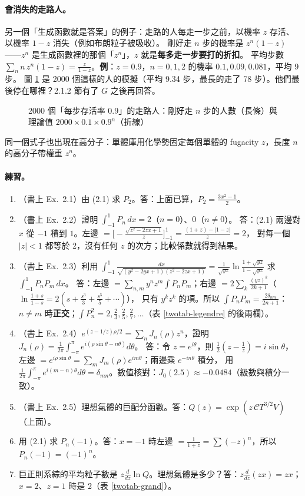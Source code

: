 \paragraph{會消失的走路人。}
另一個「生成函數就是答案」的例子：走路的人每走一步之前，以機率 $z$ 存活、以機率 $1-z$ 消失（例如布朗粒子被吸收）。
剛好走 $n$ 步的機率是 $z^n(1-z)$——$z^n$ 是生成函數裡的那個「$z^n$」，$z$ 就是\textbf{每多走一步要打的折扣}。
平均步數 $\sum_nn\,z^n(1-z)=\frac{z}{1-z}$。\textbf{例}：$z=0.9$，$n=0,1,2$ 的機率 $0.1,0.09,0.081$，平均 9 步。
圖 \ref{twofig-mortal} 是 2000 個這樣的人的模擬（平均 9.34 步，最長的走了 78 步）。他們最後停在哪裡？2.1.2 節有了 $G$ 之後再回答。
\begin{figure}[H]
\centering
\TwoFigMortal
\caption{2000 個「每步存活率 0.9」的走路人：剛好走 $n$ 步的人數（長條）與理論值 $2000\times0.1\times0.9^n$（折線）}\label{twofig-mortal}
\end{figure}
同一個式子也出現在高分子：單體庫用化學勢固定每個單體的 fugacity $z$，長度 $n$ 的高分子帶權重 $z^n$。

\paragraph{練習。}
\begin{enumerate}
\item（書上 Ex.~2.1）由 (2.1) 求 $P_2$。\quad 答：上面已算，$P_2=\frac{3x^2-1}{2}$。
\item（書上 Ex.~2.2）證明 $\int_{-1}^1P_n\,dx=2$（$n=0$）、$0$（$n\ne0$）。\quad
答：(2.1) 兩邊對 $x$ 從 $-1$ 積到 $1$。左邊 $=\Big[-\frac{\sqrt{z^2-2zx+1}}{z}\Big]_{-1}^{1}=\frac{(1+z)-|1-z|}{z}=2$，
對每一個 $|z|<1$ 都等於 2，沒有任何 $z$ 的次方；比較係數就得到結果。
\item（書上 Ex.~2.3）利用 $\int_{-1}^1\frac{dx}{\sqrt{(y^2-2yx+1)(z^2-2zx+1)}}=\frac1{\sqrt{yz}}\ln\frac{1+\sqrt{yz}}{1-\sqrt{yz}}$ 求 $\int_{-1}^1P_nP_m\,dx$。\quad
答：左邊 $=\sum_{n,m}y^nz^m\int P_nP_m$；右邊 $=2\sum_k\frac{(yz)^k}{2k+1}$（$\ln\frac{1+s}{1-s}=2(s+\frac{s^3}3+\frac{s^5}5+\cdots)$），
只有 $y^kz^k$ 的項。所以 $\int P_nP_m=\frac{2\delta_{nm}}{2n+1}$：$n\ne m$ 時\textbf{正交}；$\int P_n^2=2,\frac23,\frac25,\frac27,\dots$（表 \ref{twotab-legendre} 的後兩欄）。
\item（書上 Ex.~2.4）$e^{(z-1/z)\rho/2}=\sum_nJ_n(\rho)z^n$，證明 $J_n(\rho)=\frac1{2\pi}\int_{-\pi}^{\pi}e^{i(\rho\sin\theta-n\theta)}d\theta$。\quad
答：令 $z=e^{i\theta}$，則 $\frac12(z-\frac1z)=i\sin\theta$，左邊 $=e^{i\rho\sin\theta}=\sum_mJ_m(\rho)e^{im\theta}$；兩邊乘 $e^{-in\theta}$ 積分，
用 $\frac1{2\pi}\int_{-\pi}^{\pi}e^{i(m-n)\theta}d\theta=\delta_{mn}$。數值核對：$J_0(2.5)\approx-0.0484$（級數與積分一致）。
\item（書上 Ex.~2.5）理想氣體的巨配分函數。\quad 答：$Q(z)=\exp(z\,\mathcal CT^{3/2}V)$（上面）。
\item 用 (2.1) 求 $P_n(-1)$。\quad 答：$x=-1$ 時左邊 $=\frac1{1+z}=\sum(-z)^n$，所以 $P_n(-1)=(-1)^n$。
\item 巨正則系綜的平均粒子數是 $z\frac{d}{dz}\ln Q$。理想氣體是多少？\quad 答：$z\frac{d}{dz}(zx)=zx$；$x=2$、$z=1$ 時是 2（表 \ref{twotab-grand}）。
\end{enumerate}

